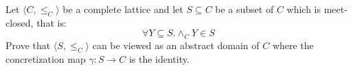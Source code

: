 {Let $\langle C, \leq_C \rangle$ be a complete lattice and let $S \subseteq C$ be a subset of $C$ which is meet-closed, that is:
$$
\forall Y \subseteq S. \wedge_C Y \in S
$$
Prove that $\langle S, \leq_C\rangle$ can be viewed as an abstract domain of $C$ where the concretization map 
$\gamma : S \to C$ is the identity.
}
{}